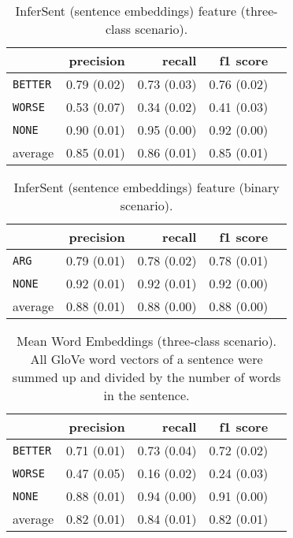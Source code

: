 	
	
	\begin{table}[h] 
		\centering 
		\caption{InferSent (sentence embeddings) feature (three-class scenario).} 
		\label{  }
		\begin{tabular}{@{}lrrrr@{}}
			\toprule
			        & precision                & recall                   & f1 score                 \\ \midrule 
			\texttt{BETTER}  & 0.79 \scriptsize{(0.02)} & 0.73 \scriptsize{(0.03)} & 0.76 \scriptsize{(0.02)} \\ 
			\texttt{WORSE}   & 0.53 \scriptsize{(0.07)} & 0.34 \scriptsize{(0.02)} & 0.41 \scriptsize{(0.03)} \\ 
			\texttt{NONE}    & 0.90 \scriptsize{(0.01)} & 0.95 \scriptsize{(0.00)} & 0.92 \scriptsize{(0.00)} \\ 
			average & 0.85 \scriptsize{(0.01)} & 0.86 \scriptsize{(0.01)} & 0.85 \scriptsize{(0.01)} \\ 
			\bottomrule
		\end{tabular}
	\end{table}
	
	\begin{table}[h] 
		\centering 
		\caption{InferSent (sentence embeddings) feature (binary scenario).} 
		\label{  }
		\begin{tabular}{@{}lrrrr@{}}
			\toprule
			        & precision                & recall                   & f1 score                 \\ \midrule 
			\texttt{ARG}     & 0.79 \scriptsize{(0.01)} & 0.78 \scriptsize{(0.02)} & 0.78 \scriptsize{(0.01)} \\ 
			\texttt{NONE}    & 0.92 \scriptsize{(0.01)} & 0.92 \scriptsize{(0.01)} & 0.92 \scriptsize{(0.00)} \\ 
			average & 0.88 \scriptsize{(0.01)} & 0.88 \scriptsize{(0.00)} & 0.88 \scriptsize{(0.00)} \\ 
			\bottomrule
		\end{tabular}
	\end{table}
	
	
	\begin{table}[h] 
		\centering 
		\caption{Mean Word Embeddings (three-class scenario). All GloVe word vectors of a sentence were summed up and divided by the number of words in the sentence.} 
		\label{  }
		\begin{tabular}{@{}lrrrr@{}}
			\toprule
			        & precision                & recall                   & f1 score                 \\ \midrule 
			\texttt{BETTER}  & 0.71 \scriptsize{(0.01)} & 0.73 \scriptsize{(0.04)} & 0.72 \scriptsize{(0.02)} \\ 
			\texttt{WORSE}   & 0.47 \scriptsize{(0.05)} & 0.16 \scriptsize{(0.02)} & 0.24 \scriptsize{(0.03)} \\ 
			\texttt{NONE}    & 0.88 \scriptsize{(0.01)} & 0.94 \scriptsize{(0.00)} & 0.91 \scriptsize{(0.00)} \\ 
			average & 0.82 \scriptsize{(0.01)} & 0.84 \scriptsize{(0.01)} & 0.82 \scriptsize{(0.01)} \\ 
			\bottomrule
		\end{tabular}
	\end{table}
	
